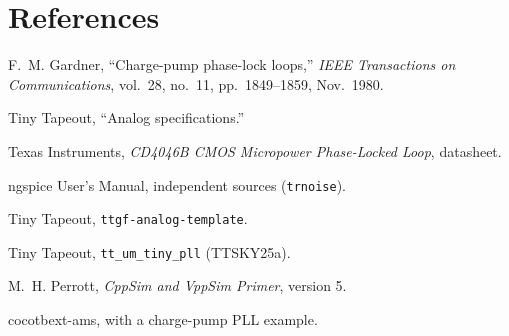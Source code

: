 \documentclass[11pt]{article}
\newcommand{\pin}[1]{\texttt{#1}}              %
\begin{document}
\section*{References}
\begin{hssources}[before={\hsgsection{References}\fontsize{9.5pt}{14pt}\selectfont\raggedright}]
\item F.~M. Gardner, ``Charge-pump phase-lock loops,'' \emph{IEEE Transactions on Communications}, vol.~28, no.~11, pp.~1849--1859, Nov.~1980.
\item Tiny Tapeout, ``Analog specifications.'' 
\item Texas Instruments, \emph{CD4046B CMOS Micropower Phase-Locked Loop}, datasheet.
\item ngspice User's Manual, independent sources (\pin{trnoise}). 
\item Tiny Tapeout, \pin{ttgf-analog-template}. 
\item Tiny Tapeout, \pin{tt\_um\_tiny\_pll} (TTSKY25a). 
\item M.~H. Perrott, \emph{CppSim and VppSim Primer}, version 5. 
\item cocotbext-ams, with a charge-pump PLL example. 
\end{hssources}
\end{document}
